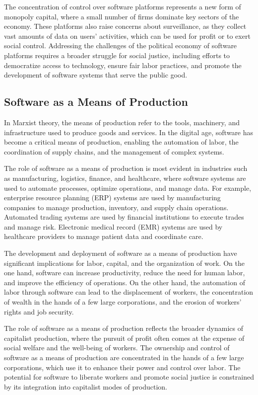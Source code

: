 \begin{refsection}
\begin{multicols}{2}
{The concentration of control over software platforms represents a new form of monopoly capital, where a small number of firms dominate key sectors of the economy. These platforms also raise concerns about surveillance, as they collect vast amounts of data on users' activities, which can be used for profit or to exert social control. Addressing the challenges of the political economy of software platforms requires a broader struggle for social justice, including efforts to democratize access to technology, ensure fair labor practices, and promote the development of software systems that serve the public good.

\subsection{Software as a Means of Production}

In Marxist theory, the means of production refer to the tools, machinery, and infrastructure used to produce goods and services. In the digital age, software has become a critical means of production, enabling the automation of labor, the coordination of supply chains, and the management of complex systems.

The role of software as a means of production is most evident in industries such as manufacturing, logistics, finance, and healthcare, where software systems are used to automate processes, optimize operations, and manage data. For example, enterprise resource planning (ERP) systems are used by manufacturing companies to manage production, inventory, and supply chain operations. Automated trading systems are used by financial institutions to execute trades and manage risk. Electronic medical record (EMR) systems are used by healthcare providers to manage patient data and coordinate care.

The development and deployment of software as a means of production have significant implications for labor, capital, and the organization of work. On the one hand, software can increase productivity, reduce the need for human labor, and improve the efficiency of operations. On the other hand, the automation of labor through software can lead to the displacement of workers, the concentration of wealth in the hands of a few large corporations, and the erosion of workers' rights and job security.

The role of software as a means of production reflects the broader dynamics of capitalist production, where the pursuit of profit often comes at the expense of social welfare and the well-being of workers. The ownership and control of software as a means of production are concentrated in the hands of a few large corporations, which use it to enhance their power and control over labor. The potential for software to liberate workers and promote social justice is constrained by its integration into capitalist modes of production.

}
\end{multicols}
\end{refsection}
